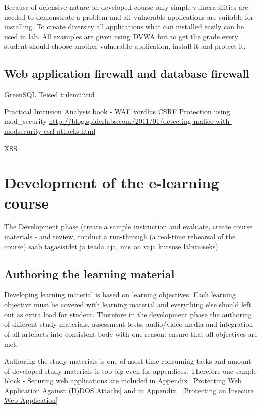 Because of defensive nature on developed course only simple vulnerabilities are needed to demonstrate a problem and all vulnerable applications are suitable for installing. To create diversity all applications what can installed easily can be used in lab. All examples are given using \gls{DVWA} but to get the grade every student should choose another vulnerable application, install it and protect it.

\subsection{Web application firewall and database firewall}
GreenSQL
Teised tulemüürid

Practical Intrusion Analysis book - WAF võrdlus \citep{book:practica_intrusion_analysis}
\gls{CSRF}
Protection using mod\_security
\url{http://blog.spiderlabs.com/2011/01/detecting-malice-with-modsecurity-csrf-attacks.html}

\gls{XSS}
%


\section{Development of the e-learning course}
The Development phase  (create a sample instruction and evaluate, create course materials - and review, conduct a run-through (a real-time rehearsal of the course) saab tagasisidet ja teada aja, mis on vaja kursuse läbimiseks)

\subsection{Authoring the learning material}
Developing learning material is based on learning objectives. Each learning objective must be covered with learning material and everything else should left out as extra load for student. Therefore in the development phase the authoring of different study materials, assessment tests, audio/video media and integration of all artefacts into consistent body with one reason: ensure that all objectives are met.

Authoring the study materials is one of most time consuming tasks and amount of developed study materials is too big even for appendices. Therefore one sample block - Securing web applications are included in Appendix~\ref{Protecting Web Application Against (D)DOS Attacks} and in Appendix~ \ref{Protecting an Insecure Web Application} 


